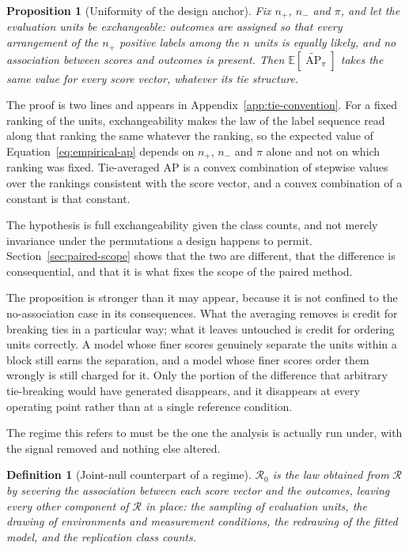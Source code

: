 \documentclass[11pt]{article}
\newcommand{\AP}{\operatorname{AP}}
\newcommand{\Regime}{\mathcal{R}}
\newcommand{\E}{\mathbb{E}}
\newcommand{\APta}{\widetilde{\AP}}
\newtheorem{definition}{Definition}
\newtheorem{proposition}{Proposition}
\theoremstyle{remark}
\begin{document}
\begin{proposition}[Uniformity of the design anchor]
\label{prop:uniformity}
Fix $n_+$, $n_-$ and $\pi$, and let the evaluation units be exchangeable: outcomes are assigned so that every arrangement of the $n_+$ positive labels among the $n$ units is equally likely, and no association between scores and outcomes is present. Then $\E[\APta_\pi]$ takes the same value for every score vector, whatever its tie structure.
\end{proposition}

The proof is two lines and appears in Appendix~\ref{app:tie-convention}. For a fixed ranking of the units, exchangeability makes the law of the label sequence read along that ranking the same whatever the ranking, so the expected value of Equation~\eqref{eq:empirical-ap} depends on $n_+$, $n_-$ and $\pi$ alone and not on which ranking was fixed. Tie-averaged AP is a convex combination of stepwise values over the rankings consistent with the score vector, and a convex combination of a constant is that constant.

The hypothesis is full exchangeability given the class counts, and not merely invariance under the permutations a design happens to permit. Section~\ref{sec:paired-scope} shows that the two are different, that the difference is consequential, and that it is what fixes the scope of the paired method.

The proposition is stronger than it may appear, because it is not confined to the no-association case in its consequences. What the averaging removes is credit for breaking ties in a particular way; what it leaves untouched is credit for ordering units correctly. A model whose finer scores genuinely separate the units within a block still earns the separation, and a model whose finer scores order them wrongly is still charged for it. Only the portion of the difference that arbitrary tie-breaking would have generated disappears, and it disappears at every operating point rather than at a single reference condition.

The regime this refers to must be the one the analysis is actually run under, with the signal removed and nothing else altered.

\begin{definition}[Joint-null counterpart of a regime]
$\Regime_0$ is the law obtained from $\Regime$ by severing the association between each score vector and the outcomes, leaving every other component of $\Regime$ in place: the sampling of evaluation units, the drawing of environments and measurement conditions, the redrawing of the fitted model, and the replication class counts.
\end{definition}
\end{document}
